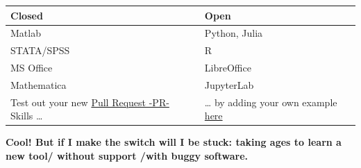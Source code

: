 \documentclass[]{book}
\begin{document}
\begin{longtable}[]{@{}ll@{}}
\toprule
\begin{minipage}[b]{0.47\columnwidth}\raggedright
Closed\strut
\end{minipage} & \begin{minipage}[b]{0.47\columnwidth}\raggedright
Open\strut
\end{minipage}\tabularnewline
\midrule
\endhead
\begin{minipage}[t]{0.47\columnwidth}\raggedright
Matlab\strut
\end{minipage} & \begin{minipage}[t]{0.47\columnwidth}\raggedright
Python, Julia\strut
\end{minipage}\tabularnewline
\begin{minipage}[t]{0.47\columnwidth}\raggedright
STATA/SPSS\strut
\end{minipage} & \begin{minipage}[t]{0.47\columnwidth}\raggedright
R\strut
\end{minipage}\tabularnewline
\begin{minipage}[t]{0.47\columnwidth}\raggedright
MS Office\strut
\end{minipage} & \begin{minipage}[t]{0.47\columnwidth}\raggedright
LibreOffice\strut
\end{minipage}\tabularnewline
\begin{minipage}[t]{0.47\columnwidth}\raggedright
Mathematica\strut
\end{minipage} & \begin{minipage}[t]{0.47\columnwidth}\raggedright
JupyterLab\strut
\end{minipage}\tabularnewline
\begin{minipage}[t]{0.47\columnwidth}\raggedright
Test out your new \href{https://help.github.com/articles/about-pull-requests/}{Pull Request -PR-} Skills \ldots{}\strut
\end{minipage} & \begin{minipage}[t]{0.47\columnwidth}\raggedright
\ldots{} by adding your own example \href{https://github.com/OpenScienceMOOC/Module-5-Open-Research-Software-and-Open-Source/blob/master/content_development/MAIN.md}{here}\strut
\end{minipage}\tabularnewline
\bottomrule
\end{longtable}

\textbf{Cool! But if I make the switch will I be stuck: taking ages to learn a new tool/ without support /with buggy software.}
\end{document}
